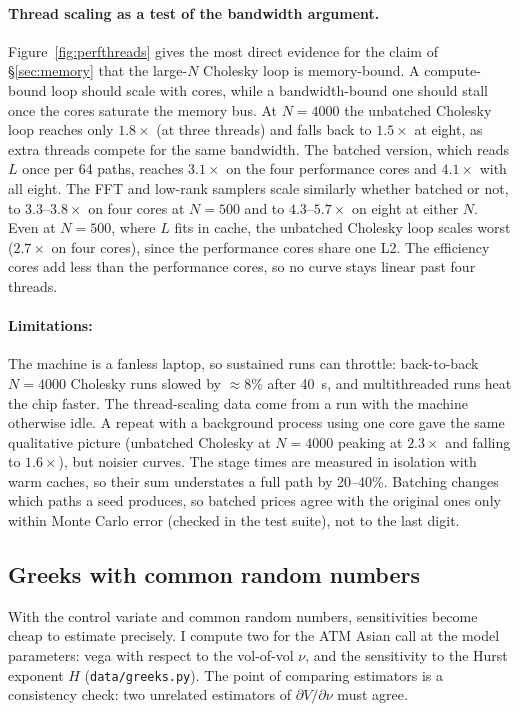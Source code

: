 \paragraph{Thread scaling as a test of the bandwidth argument. }
Figure~\ref{fig:perfthreads} gives the most direct evidence for the claim of
§\ref{sec:memory} that the large-$N$ Cholesky loop is memory-bound.  A compute-bound loop
should scale with cores, while a bandwidth-bound one should stall once the cores
saturate the memory bus.  At $N = 4000$ the unbatched Cholesky loop reaches only
$1.8\times$ (at three threads) and falls back to $1.5\times$ at eight, as extra threads
compete for the same bandwidth.  The batched version, which reads $L$ once per 64 paths,
reaches $3.1\times$ on the four performance cores and $4.1\times$ with all eight.  The FFT
and low-rank samplers scale similarly whether batched or not, to $3.3$--$3.8\times$ on
four cores at $N = 500$ and to $4.3$--$5.7\times$ on eight at either $N$.  Even at
$N = 500$, where $L$ fits in cache, the unbatched Cholesky loop scales worst
($2.7\times$ on four cores), since the performance cores share one L2.  The efficiency cores add
less than the performance cores, so no curve stays linear past four threads.

\paragraph{Limitations: }
The machine is a fanless laptop, so sustained runs can throttle: back-to-back
$N = 4000$ Cholesky runs slowed by $\approx 8\%$ after 40~s, and multithreaded runs heat
the chip faster.  The thread-scaling data come from a run with the machine otherwise
idle.  A repeat with a background process using one core gave the same qualitative
picture (unbatched Cholesky at $N = 4000$ peaking at $2.3\times$ and falling to
$1.6\times$), but noisier curves.  The stage times are measured in isolation with warm
caches, so their sum understates a full path by 20--40\%.  Batching changes which
paths a seed produces, so batched prices agree with the original ones only within Monte
Carlo error (checked in the test suite), not to the last digit.

\subsection{Greeks with common random numbers}
\label{sec:greeks}

With the control variate and common random numbers, sensitivities become cheap to
estimate precisely.  I compute two for the ATM Asian call at the model parameters:
vega with respect to the vol-of-vol $\nu$, and the sensitivity to the Hurst exponent
$H$ (\texttt{data/greeks.py}).  The point of comparing estimators is a consistency
check: two unrelated estimators of $\partial V/\partial\nu$ must agree.

